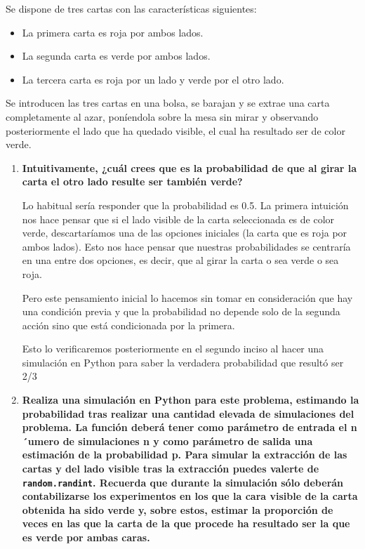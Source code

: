 \documentclass[../main.tex]{subfiles}
\begin{document}
Se dispone de tres cartas con las características siguientes:
\begin{itemize}
    \item La primera carta es roja por ambos lados.
    \item La segunda carta es verde por ambos lados.
    \item La tercera carta es roja por un lado y verde por el otro lado.
\end{itemize}

Se introducen las tres cartas en una bolsa, se barajan y se extrae una carta completamente al
azar, poníendola sobre la mesa sin mirar y observando posteriormente el lado que ha quedado
visible, el cual ha resultado ser de color verde.

\begin{enumerate}
    \item \textbf{Intuitivamente, ¿cuál crees que es la probabilidad de que al girar la carta el otro lado resulte ser también verde?}
    
    Lo habitual sería responder que la probabilidad es 0.5. La primera intuición nos hace pensar que si el lado visible de la carta seleccionada es de color verde, descartaríamos una de las opciones iniciales (la carta que es roja por ambos lados). Esto nos hace pensar que nuestras probabilidades se centraría en una entre dos opciones, es decir, que al girar la carta o sea verde o sea roja.
    
    Pero este pensamiento inicial lo hacemos sin tomar en consideración que hay una condición previa y que la probabilidad no depende solo de la segunda acción sino que está condicionada por la primera.
    
    Esto lo verificaremos posteriormente en el segundo inciso al hacer una simulación en Python para saber la verdadera probabilidad que resultó ser 2/3
    
    \item \textbf{Realiza una simulación en Python para este problema, estimando la probabilidad tras realizar una cantidad elevada de simulaciones del problema. La función deberá tener como parámetro de entrada el n´umero de simulaciones n y como parámetro de salida una estimación de la probabilidad p. Para simular la extracción de las cartas y del lado visible tras la extracción puedes valerte de \texttt{random.randint}. Recuerda que durante la simulación sólo deberán contabilizarse los experimentos en los que la cara visible de la carta obtenida ha sido verde y, sobre estos, estimar la proporción de veces en las que la carta de la que procede ha resultado ser la que es verde por ambas caras.}
    

\end{enumerate}
\end{document}
